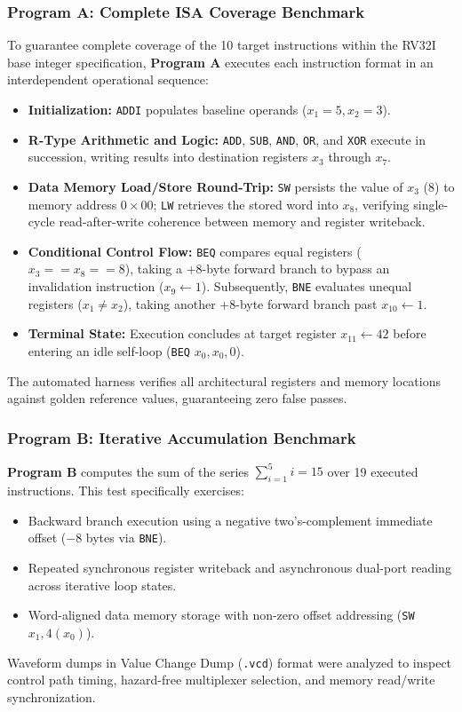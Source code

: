 \subsubsection{Program A: Complete ISA Coverage Benchmark}
To guarantee complete coverage of the 10 target instructions within the RV32I base integer specification, \textbf{Program A} executes each instruction format in an interdependent operational sequence:
\begin{itemize}
    \item \textbf{Initialization:} \texttt{ADDI} populates baseline operands ($x_1 = 5, x_2 = 3$).
    \item \textbf{R-Type Arithmetic and Logic:} \texttt{ADD}, \texttt{SUB}, \texttt{AND}, \texttt{OR}, and \texttt{XOR} execute in succession, writing results into destination registers $x_3$ through $x_7$.
    \item \textbf{Data Memory Load/Store Round-Trip:} \texttt{SW} persists the value of $x_3$ (8) to memory address $0\times00$; \texttt{LW} retrieves the stored word into $x_8$, verifying single-cycle read-after-write coherence between memory and register writeback.
    \item \textbf{Conditional Control Flow:} \texttt{BEQ} compares equal registers ($x_3 == x_8 == 8$), taking a $+8$-byte forward branch to bypass an invalidation instruction ($x_9 \leftarrow 1$). Subsequently, \texttt{BNE} evaluates unequal registers ($x_1 \neq x_2$), taking another $+8$-byte forward branch past $x_{10} \leftarrow 1$.
    \item \textbf{Terminal State:} Execution concludes at target register $x_{11} \leftarrow 42$ before entering an idle self-loop (\texttt{BEQ} $x_0, x_0, 0$).
\end{itemize}
The automated harness verifies all architectural registers and memory locations against golden reference values, guaranteeing zero false passes.

\subsubsection{Program B: Iterative Accumulation Benchmark}
\textbf{Program B} computes the sum of the series $\sum_{i=1}^{5} i = 15$ over 19 executed instructions. This test specifically exercises:
\begin{itemize}
    \item Backward branch execution using a negative two's-complement immediate offset ($-8$ bytes via \texttt{BNE}).
    \item Repeated synchronous register writeback and asynchronous dual-port reading across iterative loop states.
    \item Word-aligned data memory storage with non-zero offset addressing (\texttt{SW} $x_1, 4(x_0)$).
\end{itemize}

Waveform dumps in Value Change Dump (\texttt{.vcd}) format were analyzed to inspect control path timing, hazard-free multiplexer selection, and memory read/write synchronization.
